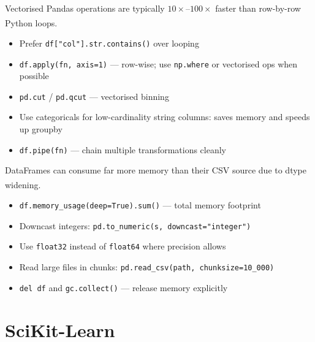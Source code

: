 \begin{tcbitemize}[ skin=sectionraster ]
    \tcbitem[title={Efficient Pandas Operations}, raster multicolumn=3]
    Vectorised Pandas operations are typically $10\times$--$100\times$ faster than row-by-row Python loops\textsuperscript{\cite{molinHandsonDataAnalysis2021}}.
    \tcblower
    \begin{itemize}
        \item Prefer \texttt{df["col"].str.contains()} over looping
        \item \texttt{df.apply(fn, axis=1)} --- row-wise; use \texttt{np.where} or vectorised ops when possible
        \item \texttt{pd.cut} / \texttt{pd.qcut} --- vectorised binning
        \item Use categoricals for low-cardinality string columns: saves memory and speeds up groupby
        \item \texttt{df.pipe(fn)} --- chain multiple transformations cleanly
    \end{itemize}

    \tcbitem[title={Memory Management}, raster multicolumn=3]
    DataFrames can consume far more memory than their CSV source due to dtype widening\textsuperscript{\cite{molinHandsonDataAnalysis2021}}.
    \tcblower
    \begin{itemize}
        \item \texttt{df.memory\_usage(deep=True).sum()} --- total memory footprint
        \item Downcast integers: \texttt{pd.to\_numeric(s, downcast="integer")}
        \item Use \texttt{float32} instead of \texttt{float64} where precision allows
        \item Read large files in chunks: \texttt{pd.read\_csv(path, chunksize=10\_000)}
        \item \texttt{del df} and \texttt{gc.collect()} --- release memory explicitly
    \end{itemize}
\end{tcbitemize}

\section{SciKit-Learn}

